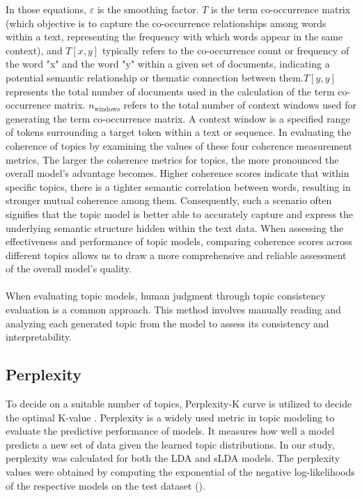 \documentclass[12pt,twoside]{article}
\begin{document}
In those equations, \(\varepsilon\) is the smoothing factor. \(T\) is the term co-occurrence matrix (which objective is to capture the co-occurrence relationships among words within a text, representing the frequency with which words appear in the same context), and \(T[x,y]\) typically refers to the co-occurrence count or frequency of the word "x" and the word "y" within a given set of documents, indicating a potential semantic relationship or thematic connection between them.\(T[y,y]\) represents the total number of documents used in the calculation of the term co-occurrence matrix. \(n_{\text{windows}}\) refers to the total number of context windows used for generating the term co-occurrence matrix. A context window is a specified range of tokens surrounding a target token within a text or sequence. In evaluating the coherence of topics by examining the values of these four coherence measurement metrics, The larger the coherence metrics for topics, the more pronounced the overall model's advantage becomes. Higher coherence scores indicate that within specific topics, there is a tighter semantic correlation between words, resulting in stronger mutual coherence among them. Consequently, such a scenario often signifies that the topic model is better able to accurately capture and express the underlying semantic structure hidden within the text data. When assessing the effectiveness and performance of topic models, comparing coherence scores across different topics allows us to draw a more comprehensive and reliable assessment of the overall model's quality.\\\\

When evaluating topic models, human judgment through topic consistency evaluation is a common approach. This method involves manually reading and analyzing each generated topic from the model to assess its consistency and interpretability.

\subsection{Perplexity}

To decide on a suitable number of topics, Perplexity-K curve is utilized to decide the optimal K-value \cite{Huang2017}. Perplexity is a widely used metric in topic modeling to evaluate the predictive performance of models. It measures how well a model predicts a new set of data given the learned topic distributions. In our study, perplexity was calculated for both the LDA and sLDA models. The perplexity values were obtained by computing the exponential of the negative log-likelihoods of the respective models on the test dataset (\cite{wallach2009evaluation}).
\end{document}
